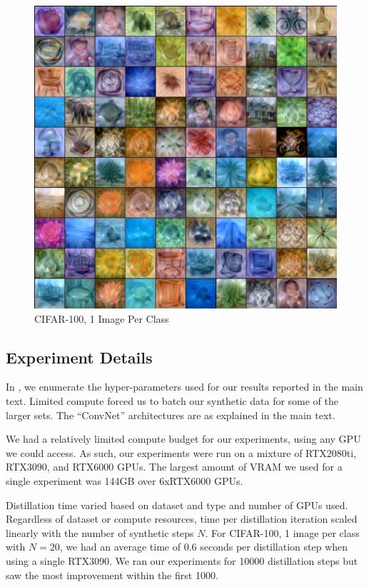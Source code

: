 \begin{figure}
    \centering
    \includegraphics[width=\linewidth]{figures/CIFAR100.pdf}
    \caption{CIFAR-100, 1 Image Per Class}
    \vspace{-9pt}
\end{figure}

\subsection{Experiment Details}
In , we enumerate the hyper-parameters used for our results reported in the main text. Limited compute forced us to batch our synthetic data for some of the larger sets. The ``ConvNet'' architectures are as explained in the main text.


 We had a relatively limited compute budget for our experiments, using any GPU we could access. As such, our experiments were run on a mixture of RTX2080ti, RTX3090, and RTX6000 GPUs. The largest amount of VRAM we used for a single experiment was 144GB over 6xRTX6000 GPUs.

 Distillation time varied based on dataset and type and number of GPUs used. Regardless of dataset or compute resources, time per distillation iteration scaled linearly with the number of synthetic steps $N$. For CIFAR-100, 1 image per class with $N=20$, we had an average time of 0.6 seconds per distillation step when using a single RTX3090. We ran our experiments for 10000 distillation steps but saw the most improvement within the first 1000.

